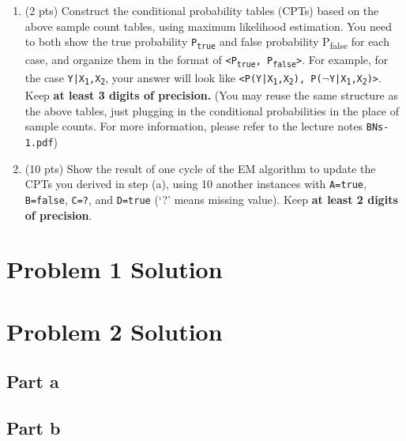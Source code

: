 \documentclass{article}
\begin{document}
\begin{enumerate}
\begin{enumerate}
\item (2 pts) Construct the conditional probability tables (CPTs) based on the above sample count tables, using maximum likelihood estimation. You need to both show the true probability \texttt{P\textsubscript{true}} and false probability P\textsubscript{false} for each case, and organize them in the format of \texttt{<P\textsubscript{true}, P\textsubscript{false}>}. For example, for the case \texttt{Y|X\textsubscript{1},X\textsubscript{2}}, your answer will look like \texttt{<P(Y|X\textsubscript{1},X\textsubscript{2}), P($\neg$Y|X\textsubscript{1},X\textsubscript{2})>}. Keep \textbf{at least 3 digits of precision.} (You may reuse the same structure as the above tables, just plugging in the conditional probabilities in the place of sample counts. For more information, please refer to the lecture notes \texttt{BNs-1.pdf})



\vspace{10pt}

\item (10 pts) Show the result of one cycle of the EM algorithm to update the CPTs you derived in step (a), using 10 another instances with \texttt{A=true}, \texttt{B=false}, \texttt{C=?}, and \texttt{D=true} (`?' means missing value). Keep \textbf{at least 2 digits of precision}.



\end{enumerate}
\end{enumerate}

\pagebreak

\section*{Problem 1 Solution}

\section*{Problem 2 Solution}
\subsection*{Part a}

\subsection*{Part b}
\end{document}
